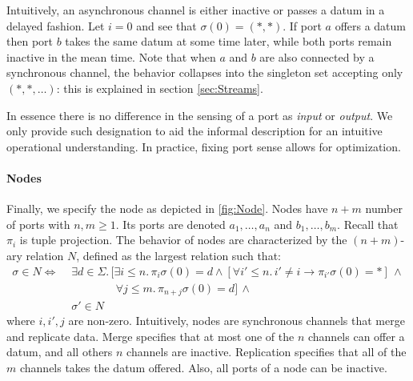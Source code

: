 Intuitively, an asynchronous channel is either inactive or passes a datum in a delayed fashion.
Let $i=0$ and see that $\sigma(0)=(*,*)$.
If port $a$ offers a datum then port $b$  takes the same datum at some time later,
while both ports remain inactive in the mean time. Note that when $a$ and $b$ are also
connected by a synchronous channel, the behavior collapses into the singleton set accepting only $(*,*,\ldots)$: this is explained in section \ref{sec:Streams}.

In essence there is no difference in the sensing of a port as \emph{input} or \emph{output}.
We only provide such designation to aid the informal description for an intuitive operational understanding. In practice, fixing port sense allows for optimization.

\paragraph{Nodes}

Finally, we specify the node as depicted in \ref{fig:Node}.
Nodes have $n+m$ number of ports with $n,m\geq1$.
Its ports are denoted $a_1,\ldots,a_n$ and $b_1,\ldots,b_m$.
Recall that $\pi_i$ is tuple projection.
The behavior of nodes are characterized by the $(n+m)$-ary relation $N$,
defined as the largest relation such that:
\begin{align*}
	\sigma\in N\Leftrightarrow\,\, & \exists d\in \Sigma.\,
	\bigl[\exists i\leq n.\,\pi_i\sigma(0) = d\land\left[\forall i'\leq n.\,i'\neq i\rightarrow\pi_{i'}\sigma(0) = *\right]\,\land\\
	& \phantom{\forall d\in D.\, \bigl[}\forall j\leq m.\,\pi_{n+j}\sigma(0)=d\bigr]\,\land\\
	& \sigma'\in N
\end{align*}
where $i,i',j$ are non-zero.
Intuitively, nodes are synchronous channels that merge and replicate data.
Merge specifies that at most one of the $n$ channels can offer a datum,
and all others $n$ channels are inactive.
Replication specifies that all of the $m$ channels takes the datum offered.
Also, all ports of a node can be inactive.
